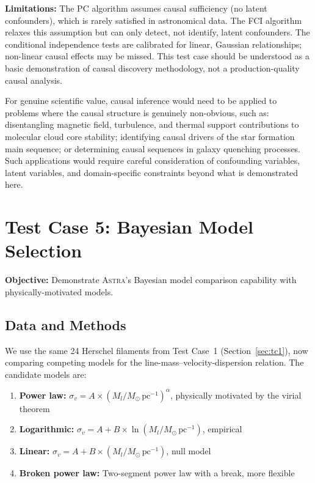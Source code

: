 \documentclass[usenatbib]{rasti}
\newcommand{\astra}{\textsc{Astra}\xspace}
\newcommand{\pc}{PC\xspace}
\newcommand{\fci}{FCI\xspace}
\begin{document}
\textbf{Limitations:}
The \pc algorithm assumes causal sufficiency (no latent confounders), which is rarely satisfied in astronomical data.
The \fci algorithm relaxes this assumption but can only detect, not identify, latent confounders.
The conditional independence tests are calibrated for linear, Gaussian relationships; non-linear causal effects may be missed.
This test case should be understood as a basic demonstration of causal discovery methodology, not a production-quality causal analysis.

For genuine scientific value, causal inference would need to be applied to problems where the causal structure is genuinely non-obvious, such as: disentangling magnetic field, turbulence, and thermal support contributions to molecular cloud core stability; identifying causal drivers of the star formation main sequence; or determining causal sequences in galaxy quenching processes.
Such applications would require careful consideration of confounding variables, latent variables, and domain-specific constraints beyond what is demonstrated here.

\section{Test Case 5: Bayesian Model Selection}
\label{sec:tc5}

\textbf{Objective:} Demonstrate \astra's Bayesian model comparison capability with physically-motivated models.

\subsection{Data and Methods}
\label{sec:tc5:data}

We use the same 24 Herschel filaments from Test Case~1 (Section~\ref{sec:tc1}), now comparing competing models for the line-mass--velocity-dispersion relation.
The candidate models are:
\begin{enumerate}
  \item[(i)] \textbf{Power law:} $\sigma_v = A \times (M_l/M_\odot\,\mathrm{pc}^{-1})^{\alpha}$, physically motivated by the virial theorem
  \item[(ii)] \textbf{Logarithmic:} $\sigma_v = A + B \times \ln(M_l/M_\odot\,\mathrm{pc}^{-1})$, empirical
  \item[(iii)] \textbf{Linear:} $\sigma_v = A + B \times (M_l/M_\odot\,\mathrm{pc}^{-1})$, null model
  \item[(iv)] \textbf{Broken power law:} Two-segment power law with a break, more flexible
\end{enumerate}
\end{document}

